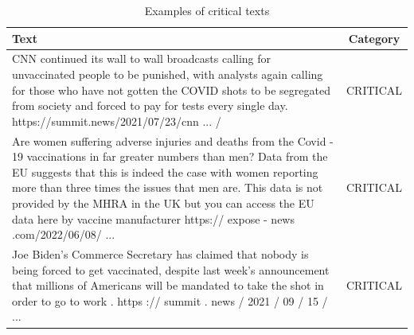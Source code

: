 \documentclass{Configuration_Files/PoliMi3i_thesis}
\begin{document}
\begin{table}[h]
    \centering
    \renewcommand{\arraystretch}{1.5} 
    \begin{tabular}{p{12cm}c}
        \hline
        \textbf{Text} & \textbf{Category} \\
        \hline
        CNN continued its wall to wall broadcasts calling for unvaccinated people to be punished, with analysts again calling for those who have not gotten the COVID shots to be segregated from society and forced to pay for tests every single day. https://summit.news/2021/07/23/cnn ... /
        & CRITICAL \\
        \hline
        Are women suffering adverse injuries and deaths from the Covid - 19 vaccinations in far greater numbers than men? Data from the EU suggests that this is indeed the case with women reporting more than three times the issues that men are. This data is not provided by the MHRA in the UK but you can access the EU data here by vaccine manufacturer https:// expose - news .com/2022/06/08/ ...
        & CRITICAL \\
        \hline
        Joe Biden's Commerce Secretary has claimed that nobody is being forced to get vaccinated, despite last week's announcement that millions of Americans will be mandated to take the shot in order to go to work . https :// summit . news / 2021 / 09 / 15 / ...
        & CRITICAL \\
        \hline
    \end{tabular}
    \caption{\small Examples of critical texts}
    \label{tab:example_binary_task_critical_text}
\end{table}
\FloatBarrier
\end{document}
